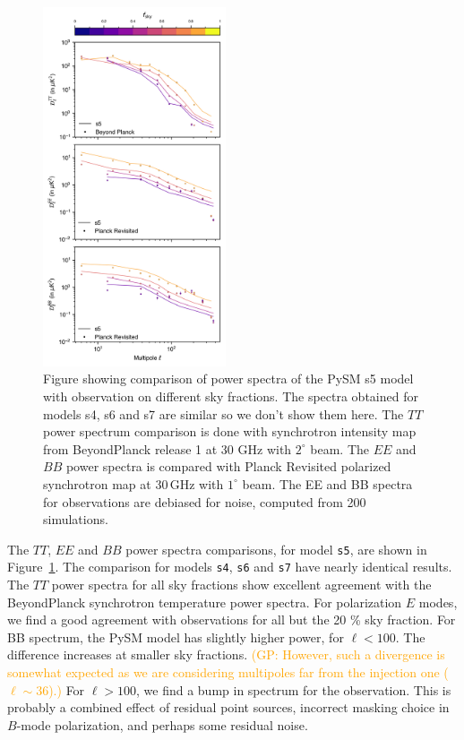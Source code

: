 \documentclass[twocolumn]{aastex631}
\newcommand{\giuse}[1]{\textcolor{orange}{(GP: #1)}}
\begin{document}
\begin{figure}
   \centering
   \includegraphics[width=0.48\textwidth]{figures/Dlcomp_PySM3-4_s5_vs_BPPR_SYNC.png}
    \caption{Figure showing comparison of power spectra of the PySM s5 model with observation on different sky fractions. The spectra obtained for models s4, s6 and s7 are similar so we don't show them here. The $TT$ power spectrum comparison is done with synchrotron intensity map from BeyondPlanck release 1 \citep{BeyondPlanck23} at 30 GHz with $2^\circ$ beam. The $EE$ and $BB$ power spectra is compared with Planck Revisited \citep{Delabrouille2024} polarized synchrotron map at 30\,GHz with $1^\circ$ beam. The EE and BB spectra for observations are debiased for noise, computed from 200 simulations.}
   \label{fig:Dl_sync_galmask}
\end{figure}

The $TT$, $EE$ and $BB$ power spectra comparisons, for model \texttt{s5}, are shown in Figure~\ref{fig:Dl_sync_galmask}. The comparison for models \texttt{s4}, \texttt{s6} and \texttt{s7} have nearly identical results. The $TT$ power spectra for all sky fractions show excellent agreement with the BeyondPlanck synchrotron temperature power spectra. For polarization $E$ modes, we find a good agreement with observations for all but the 20 \% sky fraction. 
For BB spectrum, the PySM model has slightly higher power, for $\ell < 100$. The difference increases at smaller sky fractions. 
\giuse{However, such a divergence is somewhat expected as we are considering multipoles far from the injection one ($\ell\sim36$).} 
For $\ell > 100$, we find a bump in spectrum for the observation. This is probably a combined effect of residual point sources, incorrect masking choice in $B$-mode polarization, and perhaps some residual noise.
\end{document}
